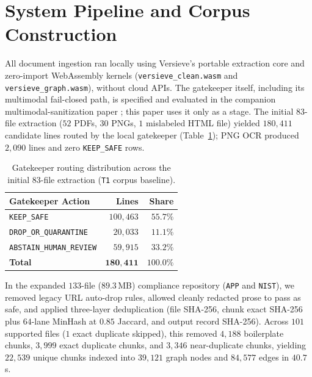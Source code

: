 \documentclass{article}
\begin{document}
\section{System Pipeline and Corpus Construction}
\label{sec:corpus}

All document ingestion ran locally using Versieve's portable extraction core and zero-import WebAssembly kernels (\texttt{versieve\_clean.wasm} and \texttt{versieve\_graph.wasm}), without cloud APIs. The gatekeeper itself, including its multimodal fail-closed path, is specified and evaluated in the companion multimodal-sanitization paper \citep{ardiyansyah2026multimodal}; this paper uses it only as a stage. The initial $83$-file extraction ($52$ PDFs, $30$ PNGs, $1$ mislabeled HTML file) yielded $180{,}411$ candidate lines routed by the local gatekeeper (Table~\ref{tab:extraction}); PNG OCR produced $2{,}090$ lines and zero \texttt{KEEP\_SAFE} rows.

\begin{table}[t]
\caption{Gatekeeper routing distribution across the initial $83$-file extraction (\texttt{T1} corpus baseline).}
\label{tab:extraction}
\vskip 0.08in
\begin{center}
\begin{tabular}{lrr}
\toprule
\textbf{Gatekeeper Action} & \textbf{Lines} & \textbf{Share} \\
\midrule
\texttt{KEEP\_SAFE} & $100{,}463$ & $55.7\%$ \\
\texttt{DROP\_OR\_QUARANTINE} & $20{,}033$ & $11.1\%$ \\
\texttt{ABSTAIN\_HUMAN\_REVIEW} & $59{,}915$ & $33.2\%$ \\
\midrule
\textbf{Total} & $\mathbf{180{,}411}$ & $\mathbf{100.0\%}$ \\
\bottomrule
\end{tabular}
\end{center}
\vskip -0.14in
\end{table}

In the expanded $133$-file ($89.3$\,MB) compliance repository (\texttt{APP} and \texttt{NIST}), we removed legacy URL auto-drop rules, allowed cleanly redacted prose to pass as safe, and applied three-layer deduplication (file SHA-256, chunk exact SHA-256 plus $64$-lane MinHash at $0.85$ Jaccard, and output record SHA-256). Across $101$ supported files ($1$ exact duplicate skipped), this removed $4{,}188$ boilerplate chunks, $3{,}999$ exact duplicate chunks, and $3{,}346$ near-duplicate chunks, yielding $22{,}539$ unique chunks indexed into $39{,}121$ graph nodes and $84{,}577$ edges in $40.7$\,s.
\end{document}
